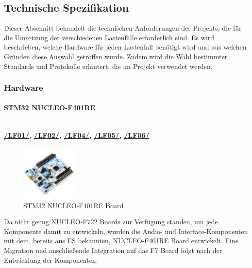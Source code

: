 \newpage
\subsection{Technische Spezifikation}
Dieser Abschnitt behandelt die technischen Anforderungen des Projekts, die für die Umsetzung der verschiedenen Lastenfälle erforderlich sind. Es wird beschrieben, welche Hardware für jeden Lastenfall benötigt wird und aus welchen Gründen diese Auswahl getroffen wurde. Zudem wird die Wahl bestimmter Standards und Protokolle erläutert, die im Projekt verwendet werden.

\subsubsection{Hardware}






\newpage
\paragraph{STM32 NUCLEO-F401RE}\label{sec:stm32-nucleo-f401re}\mbox{}\\

\textbf{{\hyperlink{LF01_Link}{/LF01/}, \hyperlink{LF02_Link}{/LF02/}, \hyperlink{lf-audiorecord}{/LF04/}, \hyperlink{lf-audioplayback}{/LF05/}, \hyperlink{lf-pitchaudio}{/LF06/}}}

\begin{figure} %
	\vspace{-10pt}
	\hspace{20pt}
	\includegraphics[width=0.25\textwidth]{images/05_technische_spezifikation/NUCLEO-F401RE.jpg}
	\caption{STM32 NUCLEO-F401RE Board}
	\label{fig:nucleo-f401re}
\end{figure}

\vspace{1em}

Da nicht genug NUCLEO-F722 Boards zur Verfügung standen, um jede Komponente damit zu entwickeln, wurden die Audio- und Interface-Komponenten mit dem, bereits aus ES bekannten, NUCLEO-F401RE Board entwickelt. Eine Migration und anschließende Integration auf das F7 Board folgt nach der Entwicklung der Komponenten.

